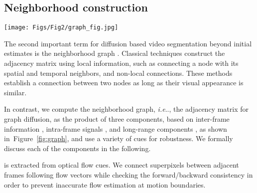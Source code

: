 \documentclass[runningheads]{llncs}
\makeatletter
\newlength\figmargin
\newlength\figcapmargin
\newcommand\para[1]{\noindent{#1}}
\def\@onedot{\ifx\@let@token.\else.\null\fi\xspace}
\DeclareRobustCommand\onedot{\futurelet\@let@token\@onedot}
\newcommand{\figref}[1]{Figure~\ref{#1}}
\def\ie{\emph{i.e}\onedot} \def\Ie{\emph{I.e}\onedot}
\newcommand{\tb}[1]{\textbf{#1}}
\makeatother
\begin{document}
\subsection{Neighborhood construction}
\label{sec:graph}
\begin{figure*}[t]
\centering
\vspace{\figmargin}
\texttt{[image: Figs/Fig2/graph\_fig.jpg]}\\
\vspace{\figcapmargin}
\caption{{\tb{Graph construnction}}. In our method, we construct a graph for diffusing the initial motion saliency estimation. Our graph contains 1) edge-aware spatial connections (intra-frame connections), 2) flow-based temporal connections (inter-frame connections and 3) non-local long range connections. We show the initial motion saliency and the diffused saliency map using the constructed graph. We found  these three types of connections to help propagate the initial saliency estimation  effectively.}
\label{fig:graph}
\vspace{\figmargin}
\end{figure*} The second important term for diffusion based video segmentation beyond initial estimates is the neighborhood graph . Classical techniques construct the adjacency matrix using local information, such as connecting a node with its spatial and temporal neighbors, and non-local connections. These methods establish a connection between two nodes as long as their visual appearance is similar. 

In contrast, we compute the neighborhood graph, \ie, the adjacency matrix for graph diffusion,  as the product of three components, based on inter-frame information , intra-frame signals , and long-range components , as shown in~\figref{fig:graph}, and use a variety of cues for robustness. We formally discuss each of the components in the following. 

\para{\bf Inter-frame temporal information} is extracted from optical flow cues. We connect superpixels between adjacent frames following flow vectors while checking the forward/backward consistency in order to prevent inaccurate flow estimation at motion boundaries.
\end{document}
